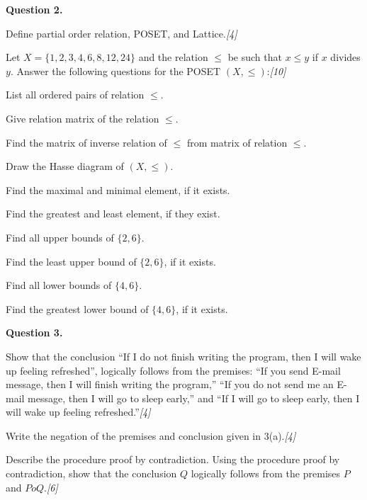 \documentclass[11pt,a4paper]{article}
\newcommand{\pts}[1]{\hfill   \textit{[#1]}}
\begin{document}
\medskip


\noindent   \textbf{Question 2.}

\begin{parts}
  \item Define partial order relation, POSET, and Lattice.\pts{4}
  \item Let $X = \{1, 2, 3, 4, 6, 8, 12, 24\}$ and the relation $\le$ be such that $x \le y$ if $x$ divides $y$. Answer the following questions for the POSET $(X, \le)$:\pts{10}
  
\begin{parts}
    \item List all ordered pairs of relation $\le$.
    \item Give relation matrix of the relation $\le$.
    \item Find the matrix of inverse relation of $\le$ from matrix of relation $\le$.
    \item Draw the Hasse diagram of $(X, \le)$.
    \item Find the maximal and minimal element, if it exists.
    \item Find the greatest and least element, if they exist.
    \item Find all upper bounds of $\{2, 6\}$.
    \item Find the least upper bound of $\{2, 6\}$, if it exists.
    \item Find all lower bounds of $\{4, 6\}$.
    \item Find the greatest lower bound of $\{4, 6\}$, if it exists.
  \end{parts}
\end{parts}

\medskip


\noindent   \textbf{Question 3.}

\begin{parts}
  \item Show that the conclusion ``If I do not finish writing the program, then I will wake up feeling refreshed'', logically follows from the premises: ``If you send E-mail message, then I will finish writing the program,'' ``If you do not send me an E-mail message, then I will go to sleep early,'' and ``If I will go to sleep early, then I will wake up feeling refreshed.''\pts{4}
  \item Write the negation of the premises and conclusion given in 3(a).\pts{4}
  \item Describe the procedure proof by contradiction. Using the procedure proof by contradiction, show that the conclusion $Q$ logically follows from the premises $P$ and $P  o Q$.\pts{6}
\end{parts}
\end{document}

